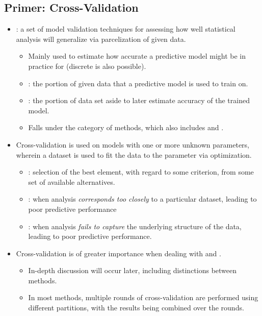 \begin{itemize}
  \subsection{Primer: Cross-Validation}
    \begin{itemize}
    \item {}: a set of model validation techniques for assessing how well statistical analysis will generalize via parcelization of given data. 
      \begin{itemize}
        \item Mainly used to estimate how accurate a predictive model might be in practice for \hyperref[Subsection: Data Types]{} (discrete is also possible).
        \item {}: the portion of given data that a predictive model is used to train on. 
        \item {}: the portion of data set aside to later estimate accuracy of the trained model.
        \item Falls under the category of  methods, which also includes \hyperref[Subsection: Primer: Permutation Testing]{} and \hyperref[Subsection: Primer: Bootstrapping]{}.
      \end{itemize}
    \item Cross-validation is used on models with one or more unknown parameters, wherein a dataset is used to fit the data to the parameter via optimization.
      \begin{itemize}
        \item {}: selection of the best element, with regard to some criterion, from some set of available alternatives.
        \item {}: when analysis \emph{corresponds too closely} to a particular dataset, leading to poor predictive performance
        \item {}: when analysis \emph{fails to capture} the underlying structure of the data, leading to poor predictive performance.
      \end{itemize}
    \item Cross-validation is of greater importance when dealing with \hyperref[Chapter: Regression]{} and \hyperref[Section: Confidence Intervals]{}.
      \begin{itemize}
        \item In-depth discussion will occur later, including distinctions between \hyperref[Subsection: Exhaustive vs. Non-Exhaustive]{} methods. 
        \item In most methods, multiple rounds of cross-validation are performed using different partitions, with the results being combined over the rounds.
      \end{itemize}
  \end{itemize}


\end{itemize}
